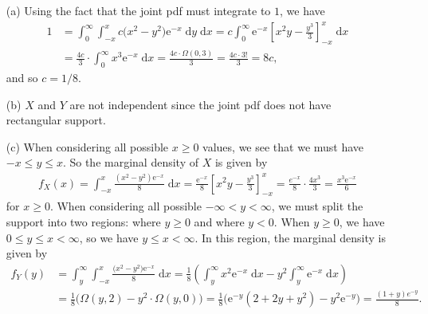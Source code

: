 \documentclass[10pt]{article}
\begin{document}
\begin{itemize}
    \item[(a)] 
    Using the fact that the joint pdf must integrate to \(1\), we have 
    \begin{align*}
        1 &= \int_0^{\infty} \int_{-x}^{x} c \big( x^2 - y^2 \big) \mathrm{e}^{-x} \;\mathrm{d}y \;\mathrm{d}x
        = c \int_0^{\infty} \mathrm{e}^{-x} \left[ x^2y - \frac{y^3}{3} \right]_{-x}^{x} \;\mathrm{d}x \\
        &= \frac{4c}{3} \cdot \int_0^{\infty} x^3 \mathrm{e}^{-x} \;\mathrm{d}x
        = \frac{4c \cdot \Omega(0,3)}{3} 
        = \frac{4c \cdot 3!}{3}
        = 8 c,
    \end{align*}
    and so \(c = 1/8\). 
    \item[(b)] \(X\) and \(Y\) are not independent since the joint pdf does not have rectangular support. 
    \item[(c)] When considering all possible \(x \ge 0\) values, we see that we must have \(-x \le y \le x\). 
    So the marginal density of \(X\) is given by 
    \begin{align*}
        f_X(x) = \int_{-x}^x \frac{(x^2 - y^2)\mathrm{e}^{-x}}{8} \;\mathrm{d}x
        = \frac{\mathrm{e}^{-x}}{8} \left[ x^2y - \frac{y^3}{3} \right]_{-x}^x
        = \frac{e^{-x}}{8} \cdot \frac{4 x^3}{3}
        = \frac{x^3 \mathrm{e}^{-x}}{6}
    \end{align*}
    for \(x \ge 0\). When considering all possible \(-\infty < y < \infty\), we must split the support into two regions: where \(y \ge 0\) and 
    where \(y < 0\). When \(y \ge 0\), we have \(0 \le y \le x < \infty\), so we have \(y \le x < \infty\). In this region, the marginal density 
    is given by 
    \begin{align*}
        f_Y(y) &= \int_y^{\infty} \int_{-x}^{x} \frac{\big( x^2 - y^2 \big) \mathrm{e}^{-x}}{8} \;\mathrm{d}x
        = \frac{1}{8} \left( \int_y^{\infty} x^2 \mathrm{e}^{-x} \;\mathrm{d}x - y^2 \int_y^{\infty} \mathrm{e}^{-x} \;\mathrm{d}x \right) \\
        &= \frac{1}{8} \big( \Omega(y,2) - y^2 \cdot \Omega(y,0) \big)
        = \frac{1}{8} \big( \mathrm{e}^{-y}(2 + 2y + y^2) - y^2\mathrm{e}^{-y} \big)
        = \frac{(1 + y) e^{-y}}{8}.
    \end{align*}

\end{itemize}
\end{document}

